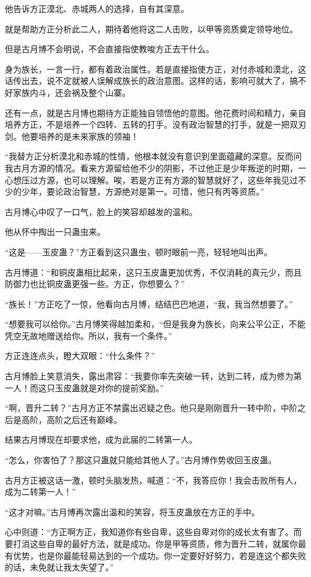 \begin{this_body}
他告诉方正漠北、赤城两人的选择，自有其深意。

就是帮助方正分析此二人，期待着他将这二人击败，以甲等资质奠定领导地位。

但是古月博不会明说，不会直接指使教唆方正去干什么。

身为族长，一言一行，都有着政治属性。若是直接指使方正，对付赤城和漠北，这话传出去，说不定就被人误解成族长的政治意图。这样的话，影响可就大了，搞不好家族内斗，还会祸及整个山寨。

还有一点，就是古月博也期待方正能独自领悟他的意图。他花费时间和精力，亲自培养方正，不是培养一个四转、五转的打手。没有政治智慧的打手，就是一把双刃剑。他要培养的是未来家族的领袖！

“我替方正分析漠北和赤城的性情，他根本就没有意识到里面蕴藏的深意。反而问我古月方源的情况。看来方源留给他不少的阴影，不过他正是少年叛逆的时期，一心想压过方源，也可以理解。唉，若是方正有方源的智慧就好了，这些年我见过不少的少年，要论政治智慧，方源绝对是第一。可惜，他只有丙等资质。”

古月博心中叹了一口气，脸上的笑容却越发的温和。

他从怀中掏出一只蛊虫来。

“这是——玉皮蛊？”方正看到这只蛊虫，顿时眼前一亮，轻轻地叫出声。

古月博道：“和铜皮蛊相比起来，这只玉皮蛊更加优秀，不仅消耗的真元少，而且防御力也比铜皮蛊更强一些。方正，你想要么？”

“族长！”方正吃了一惊，他看向古月博，结结巴巴地道，“我，我当然想要了。”

“想要我可以给你。”古月博笑得越加柔和，“但是我身为族长，向来公平公正，不能凭空无故地赠送给你。所以，我有一个条件。”

方正连连点头，瞪大双眼：“什么条件？”

古月博脸上笑意消失，露出肃容：“我要你率先突破一转，达到二转，成为修为第一人！而这只玉皮蛊就是对你的提前奖励。”

“啊，晋升二转？”古月方正不禁露出迟疑之色。他只是刚刚晋升一转中阶，中阶之后是高阶，高阶之后还有巅峰。

结果古月博现在却要求他，成为此届的二转第一人。

“怎么，你害怕了？那这只蛊就只能给其他人了。”古月博作势收回玉皮蛊。

古月方正被这话一激，顿时头脑发热，喊道：“不，我答应你！我会击败所有人，成为二转第一人！”

“这才对嘛。”古月博再次露出温和的笑容，将玉皮蛊放在方正的手中。

心中则道：“方正啊方正，我知道你有些自卑，这些自卑对你的成长太有害了。而要打消这些自卑的最好方法，就是成功。你是甲等资质，修为晋升二转，就属你最有优势，也是你最能轻易达到的一个成功。你一定要好好努力，若是连这个都失败的话，未免就让我太失望了。”


\end{this_body}
